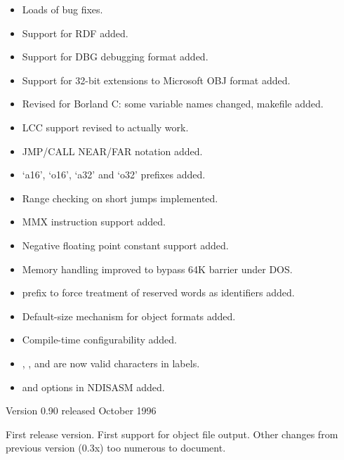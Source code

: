 
\begin{itemize}
    \item{Loads of bug fixes.}
    \item{Support for RDF added.}
    \item{Support for DBG debugging format added.}
    \item{Support for 32-bit extensions to Microsoft OBJ format added.}
    \item{Revised for Borland C: some variable names changed, makefile added.}
    \item{LCC support revised to actually work.}
    \item{JMP/CALL NEAR/FAR notation added.}
    \item{`a16', `o16', `a32' and `o32' prefixes added.}
    \item{Range checking on short jumps implemented.}
    \item{MMX instruction support added.}
    \item{Negative floating point constant support added.}
    \item{Memory handling improved to bypass 64K barrier under DOS.}
    \item{\code{\$} prefix to force treatment of reserved words as identifiers added.}
    \item{Default-size mechanism for object formats added.}
    \item{Compile-time configurability added.}
    \item{\code{\#}, \code{\@}, \code{\textasciitilde} and  are now valid characters in labels.}
    \item{ and  options in NDISASM added.}
\end{itemize}

 Version 0.90 released October 1996

First release version. First support for object file output. Other
changes from previous version (0.3x) too numerous to document.
